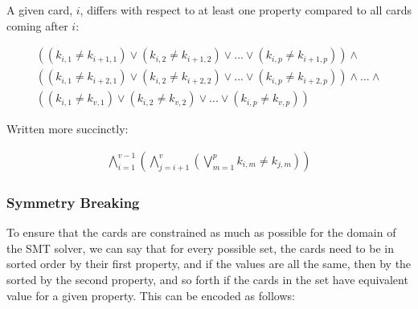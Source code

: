 \documentclass[pageno]{jpaper}
\begin{document}

A given card, $i$, differs with respect to at least one property compared to all cards coming after $i:$

\begin{multline}
	((k_{i,1} \neq k_{i+1,1}) \vee (k_{i,2} \neq k_{i+1,2}) \vee ... \vee (k_{i,p} \neq k_{i+1,p}))  \wedge \\
	((k_{i,1} \neq k_{i+2,1}) \vee (k_{i,2} \neq k_{i+2,2}) \vee ... \vee (k_{i,p} \neq k_{i+2,p}))  \wedge ... \wedge \\ 
	((k_{i,1} \neq k_{v,1}) \vee (k_{i,2} \neq k_{v,2}) \vee ... \vee (k_{i,p} \neq k_{v,p})) 
\end{multline}

Written more succinctly:





\begin{align}
	\bigwedge \limits_{i=1}^{v-1}   \left( \bigwedge \limits_{j=i+1}^{v}   \left( \bigvee \limits_{m = 1}^{p} k_{i,m} \neq k_{j,m} \right)  \right)
\end{align}

\subsubsection {Symmetry Breaking}

To ensure that the cards are constrained as much as possible for the domain of the SMT solver, we can say that for every possible set, the cards need to be in sorted order by their first property, and if the values are all the same, then by the sorted by the second property, and so forth if the cards in the set have equivalent value for a given property. This can be encoded as follows: 
\end{document}
